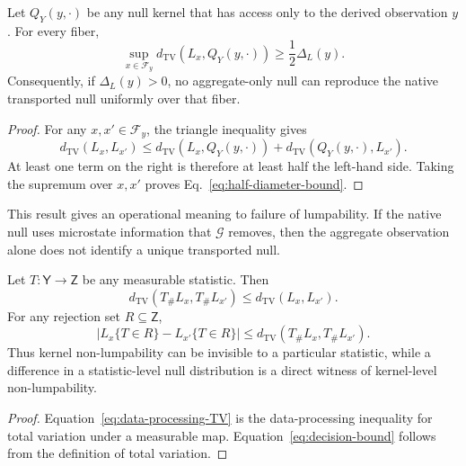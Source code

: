 \begin{proposition}
\label{prop:half-diameter}
Let $Q_Y(y,\cdot)$ be any null kernel that has access only to the derived
observation $y$.  For every fiber,
\begin{equation}
\sup_{x\in\mathcal F_y}
 d_{\mathrm{TV}}\!\left(L_x,Q_Y(y,\cdot)\right)
\ge \frac{1}{2}\Delta_L(y).
\label{eq:half-diameter-bound}
\end{equation}
Consequently, if $\Delta_L(y)>0$, no aggregate-only null can reproduce the
native transported null uniformly over that fiber.
\end{proposition}

\begin{proof}
For any $x,x'\in\mathcal F_y$, the triangle inequality gives
\[
d_{\mathrm{TV}}(L_x,L_{x'})
\le d_{\mathrm{TV}}(L_x,Q_Y(y,\cdot))
+d_{\mathrm{TV}}(Q_Y(y,\cdot),L_{x'}).
\]
At least one term on the right is therefore at least half the left-hand side.
Taking the supremum over $x,x'$ proves Eq.~\eqref{eq:half-diameter-bound}.
\end{proof}

This result gives an operational meaning to failure of lumpability.  If the
native null uses microstate information that $\mathcal G$ removes, then the
aggregate observation alone does not identify a unique transported null.

\begin{corollary}\label{cor:statistic-projection}
Let $T:\mathsf Y\to\mathsf Z$ be any measurable statistic.  Then
\begin{equation}
d_{\mathrm{TV}}(T_\#L_x,T_\#L_{x'})
\le d_{\mathrm{TV}}(L_x,L_{x'}).
\label{eq:data-processing-TV}
\end{equation}
For any rejection set $R\subseteq\mathsf Z$,
\begin{equation}
\left|
L_x\{T\in R\}-L_{x'}\{T\in R\}
\right|
\le d_{\mathrm{TV}}(T_\#L_x,T_\#L_{x'}).
\label{eq:decision-bound}
\end{equation}
Thus kernel non-lumpability can be invisible to a particular statistic, while
a difference in a statistic-level null distribution is a direct witness of
kernel-level non-lumpability.
\end{corollary}

\begin{proof}
Equation~\eqref{eq:data-processing-TV} is the data-processing inequality for
total variation under a measurable map.  Equation~\eqref{eq:decision-bound}
follows from the definition of total variation.
\end{proof}

